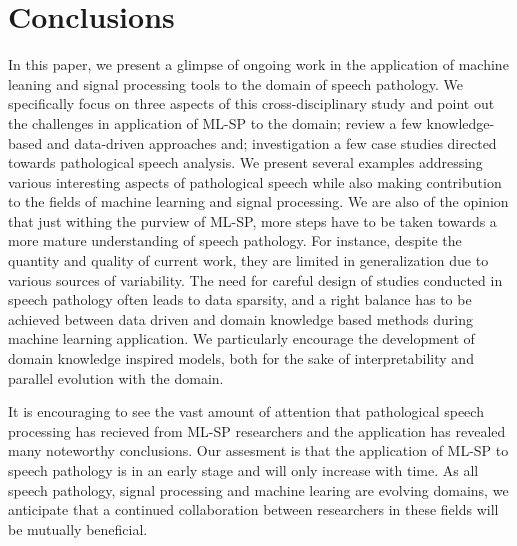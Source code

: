 \documentclass{article}
\begin{document}
\section{Conclusions}

In this paper, we present a glimpse of ongoing work in the application of machine leaning and signal processing tools to the domain of speech pathology.
We specifically focus on three aspects of this cross-disciplinary study and point out the challenges in application of ML-SP to the domain; review a few knowledge-based and data-driven approaches and; investigation a few case studies directed towards pathological speech analysis.
We present several examples addressing various interesting aspects of pathological speech while also making contribution to the fields of machine learning and signal processing. 
We are also of the opinion that just withing the purview of ML-SP, more steps have to be taken towards a more mature understanding of speech pathology. 
For instance, despite the quantity and quality of current work, they are limited in generalization due to various sources of variability.
The need for careful design of studies conducted in speech pathology often leads to data sparsity, and a right balance has to be achieved between data driven and domain knowledge based methods during machine learning application.
We particularly encourage the development of domain knowledge inspired models, both for the sake of interpretability and parallel evolution with the domain. 

It is encouraging to see the vast amount of attention that pathological speech processing has recieved from ML-SP researchers and the application has revealed many noteworthy conclusions.
Our assesment is that the application of ML-SP to speech pathology is in an early stage and will only increase with time.
As all speech pathology, signal processing and machine learing are evolving domains, we anticipate that a continued collaboration between researchers in these fields will be mutually beneficial.

\begin{spacing}{.84}
\vfill\pagebreak




\end{spacing}
\end{document}
